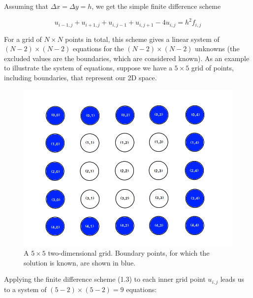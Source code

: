 \documentclass[11pt]{report}
\begin{document}
Assuming that $\Delta x = \Delta y = h$, we get the simple finite difference scheme

\begin{equation}
u_{i-1,j} + u_{i+1,j} + u_{i,j-1} + u_{i,j+1} - 4u_{i,j} = h^2 f_{i,j}
\end{equation}

For a grid of $N \times N$ points in total, this scheme gives a linear system of $(N-2) \times (N-2)$ equations for the $(N-2) \times (N-2)$ unknowns (the excluded values are the boundaries, which are considered known). As an example to illustrate the system of equations, suppose we have a $5 \times 5$ grid of points, including boundaries, that represent our 2D space. 

\begin{figure}[h]
\centering
\includegraphics[scale=0.35]{images/grid}
\caption{A $5 \times 5$ two-dimensional grid. 
Boundary points, for which the solution is known, are shown in blue. }
\label{fig:Space grid 5x5}
\end{figure}

Applying the finite difference scheme (1.3) to each inner grid point $u_{i,j}$ leads us to a system of $(5-2) \times (5-2) = 9$ equations:
\end{document}
